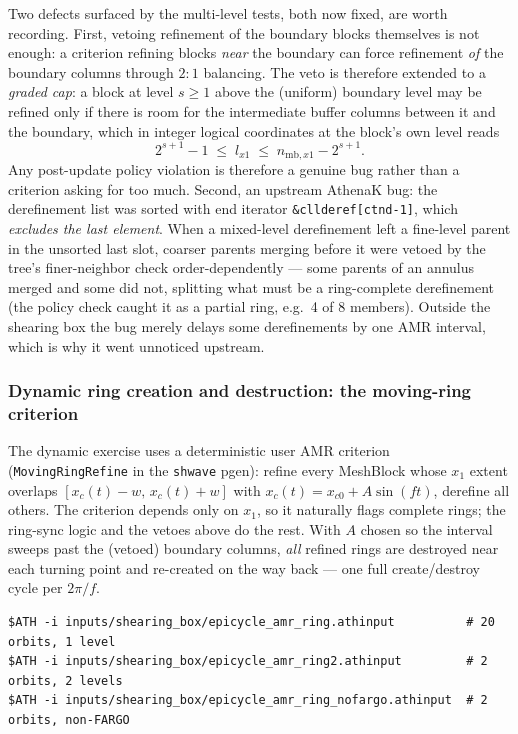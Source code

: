 \documentclass[11pt]{article}
\newcommand{\code}[1]{\texttt{#1}}
\begin{document}
Two defects surfaced by the multi-level tests, both now fixed, are worth recording.
First, vetoing refinement of the boundary blocks themselves is not enough: a
criterion refining blocks \emph{near} the boundary can force refinement \emph{of}
the boundary columns through $2{:}1$ balancing. The veto is therefore extended to a
\emph{graded cap}: a block at level $s \geq 1$ above the (uniform) boundary level
may be refined only if there is room for the intermediate buffer columns between it
and the boundary, which in integer logical coordinates at the block's own level reads
\begin{equation}
  2^{s+1} - 1 \;\le\; l_{x1} \;\le\; n_{\mathrm{mb},x1} - 2^{s+1}.
  \label{eq:gradedcap}
\end{equation}
Any post-update policy violation is therefore a genuine bug rather than a criterion
asking for too much. Second, an upstream AthenaK bug: the derefinement list was
sorted with end iterator \code{\&cllderef[ctnd-1]}, which \emph{excludes the last
element}. When a mixed-level derefinement left a fine-level parent in the unsorted
last slot, coarser parents merging before it were vetoed by the tree's
finer-neighbor check order-dependently --- some parents of an annulus merged and
some did not, splitting what must be a ring-complete derefinement (the policy check
caught it as a partial ring, e.g.\ 4 of 8 members). Outside the shearing box the bug
merely delays some derefinements by one AMR interval, which is why it went
unnoticed upstream.

\subsubsection{Dynamic ring creation and destruction: the moving-ring criterion}
The dynamic exercise uses a deterministic user AMR criterion
(\code{MovingRingRefine} in the \code{shwave} pgen): refine every MeshBlock whose
$x_1$ extent overlaps $[x_c(t)-w,\,x_c(t)+w]$ with
$x_c(t) = x_{c0} + A\sin(ft)$, derefine all others. The criterion depends only on
$x_1$, so it naturally flags complete rings; the ring-sync logic and the vetoes
above do the rest. With $A$ chosen so the interval sweeps past the (vetoed)
boundary columns, \emph{all} refined rings are destroyed near each turning point
and re-created on the way back --- one full create/destroy cycle per
$2\pi/f$.

\begin{lstlisting}
$ATH -i inputs/shearing_box/epicycle_amr_ring.athinput          # 20 orbits, 1 level
$ATH -i inputs/shearing_box/epicycle_amr_ring2.athinput         # 2 orbits, 2 levels
$ATH -i inputs/shearing_box/epicycle_amr_ring_nofargo.athinput  # 2 orbits, non-FARGO
\end{lstlisting}
\end{document}
